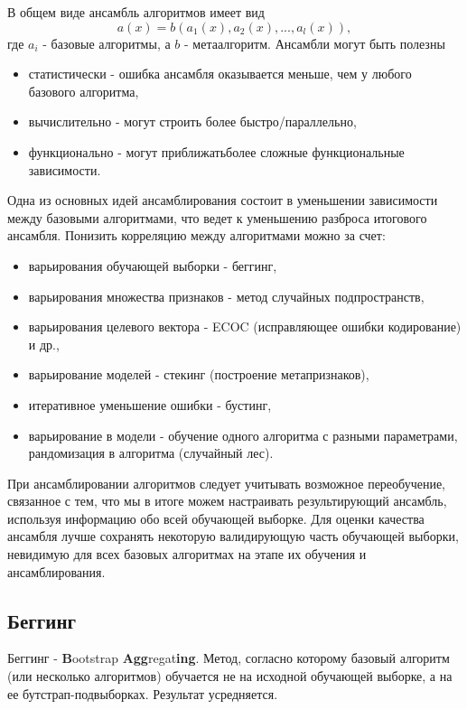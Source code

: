 В общем виде ансамбль алгоритмов имеет вид
$$
a(x) = b(a_1(x), a_2(x), ..., a_l(x)),
$$
где $a_i$ - базовые алгоритмы, а $b$ - метаалгоритм. Ансамбли могут быть полезны
\begin{itemize}
    \item статистически - ошибка ансамбля оказывается меньше, чем у любого базового алгоритма,
    \item вычислительно - могут строить более быстро/параллельно,
    \item функционально - могут приближатьболее сложные функциональные зависимости.
\end{itemize}

Одна из основных идей ансамблирования состоит в уменьшении зависимости между базовыми алгоритмами, что ведет к уменьшению разброса итогового ансамбля.
Понизить корреляцию между алгоритмами можно за счет:
\begin{itemize}
    \item варьирования обучающей выборки - беггинг,
    \item варьирования множества признаков - метод случайных подпространств,
    \item варьирования целевого вектора - ECOC (исправляющее ошибки кодирование) и др.,
    \item варьирование моделей - стекинг (построение метапризнаков),
    \item итеративное уменьшение ошибки - бустинг,
    \item варьирование в модели - обучение одного алгоритма с разными параметрами, рандомизация в алгоритма (случайный лес).
\end{itemize} 

При ансамблировании алгоритмов следует учитывать возможное переобучение, связанное с тем, что мы в итоге можем настраивать результирующий ансамбль, используя информацию обо всей обучающей выборке. Для оценки качества ансамбля лучше сохранять некоторую валидирующую часть обучающей выборки, невидимую для всех базовых алгоритмах на этапе их обучения и ансамблирования.   

\subsection{Беггинг}

Беггинг - \textbf{B}ootstrap \textbf{Agg}regat\textbf{ing}. Метод, согласно которому базовый алгоритм (или несколько алгоритмов) обучается не на исходной обучающей выборке, а на ее бутстрап-подвыборках. Результат усредняется.

